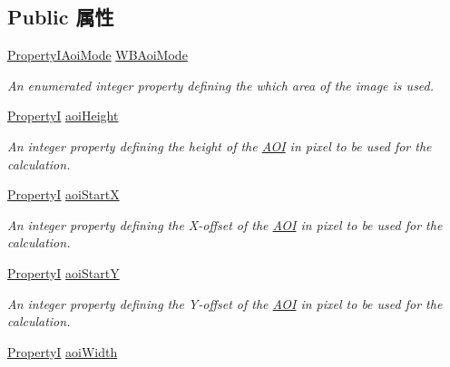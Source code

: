 \subsection*{Public 属性}
\begin{DoxyCompactItemize}
\item 
\hyperlink{group___common_interface_gac29dd0ca928e4e97eeb1a038ddb4f2af}{Property\+I\+Aoi\+Mode} \hyperlink{classmv_i_m_p_a_c_t_1_1acquire_1_1_white_balance_settings_a60af41e60e38c698d39b36ee745b2648}{W\+B\+Aoi\+Mode}
\begin{DoxyCompactList}\small\item\em An enumerated integer property defining the which area of the image is used. \end{DoxyCompactList}\item 
\hyperlink{group___common_interface_ga12d5e434238ca242a1ba4c6c3ea45780}{Property\+I} \hyperlink{classmv_i_m_p_a_c_t_1_1acquire_1_1_white_balance_settings_ae0c4fe8b5a258b6b9950d13c9c3c7133}{aoi\+Height}
\begin{DoxyCompactList}\small\item\em An integer property defining the height of the \hyperlink{struct_a_o_i}{A\+O\+I} in pixel to be used for the calculation. \end{DoxyCompactList}\item 
\hyperlink{group___common_interface_ga12d5e434238ca242a1ba4c6c3ea45780}{Property\+I} \hyperlink{classmv_i_m_p_a_c_t_1_1acquire_1_1_white_balance_settings_a8fefb19aac00ba084b3330dedcddbe1c}{aoi\+Start\+X}
\begin{DoxyCompactList}\small\item\em An integer property defining the X-\/offset of the \hyperlink{struct_a_o_i}{A\+O\+I} in pixel to be used for the calculation. \end{DoxyCompactList}\item 
\hyperlink{group___common_interface_ga12d5e434238ca242a1ba4c6c3ea45780}{Property\+I} \hyperlink{classmv_i_m_p_a_c_t_1_1acquire_1_1_white_balance_settings_a04c25fbcb772dcca1335d4a2b793dd02}{aoi\+Start\+Y}
\begin{DoxyCompactList}\small\item\em An integer property defining the Y-\/offset of the \hyperlink{struct_a_o_i}{A\+O\+I} in pixel to be used for the calculation. \end{DoxyCompactList}\item 
\hyperlink{group___common_interface_ga12d5e434238ca242a1ba4c6c3ea45780}{Property\+I} \hyperlink{classmv_i_m_p_a_c_t_1_1acquire_1_1_white_balance_settings_a32307a598d3cadc6d07a829af463834b}{aoi\+Width}

\end{DoxyCompactItemize}
